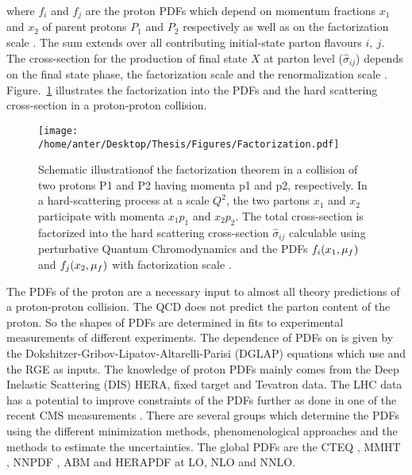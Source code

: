 where $f_i$ and $f_{j}$ are the proton PDFs which depend on momentum fractions $x_1$ and $x_2$ of parent protons $P_1$ and $P_2$ respectively as well as on the factorization scale \muf. The sum extends over all contributing initial-state parton flavours $i,~j$. The cross-section for the production of final state $X$ at parton level ($\hat\sigma_{ij}$) depends on the final state phase, the factorization scale \muf and the renormalization scale \mur. Figure.~\ref{fig:fac} illustrates the factorization into the PDFs and the hard scattering cross-section in a proton-proton collision.
\begin{figure}[!h]
\begin{center}
\hspace*{-7mm}
\texttt{[image: /home/anter/Desktop/Thesis/Figures/Factorization.pdf]}\\
\vspace*{4mm}
\caption[Schematic illustration of factorization theorem in a collision of two protons.]{Schematic illustration\footnotemark of the factorization theorem in a collision of two protons P1 and P2 having momenta p1 and p2, respectively. In a hard-scattering process at a scale $Q^2$, the two partons $x_1$ and $x_2$ participate with momenta $x_1p_1$ and $x_2p_2$. The total cross-section is factorized into the hard scattering cross-section $\hat\sigma_{ij}$ calculable using perturbative Quantum Chromodynamics and the PDFs $f_i(x_1,\mu_f)$ and $f_j(x_2,\mu_f)$ with factorization scale \muf.}
\label{fig:fac}
\end{center}
\end{figure}
The PDFs of the proton are a necessary input to almost all theory predictions of a proton-proton collision. The QCD does not predict the parton content of the proton. So the shapes of PDFs are determined in fits to experimental measurements of different experiments. The dependence of PDFs on \muf is given by the Dokshitzer-Gribov-Lipatov-Altarelli-Parisi (DGLAP) \cite{Gribov:1972ri,Dokshitzer:1977sg,Altarelli:1977zs} equations which use \alps and the RGE as inputs. The knowledge of proton PDFs mainly comes from the Deep Inelastic Scattering (DIS) HERA, fixed target and Tevatron data. The LHC data has a potential to improve constraints of the PDFs further as done in one of the recent CMS measurements \cite{Sirunyan:2017skj}. There are several groups which determine the PDFs using the different minimization methods, phenomenological approaches and the methods to estimate the uncertainties. The global PDFs are the CTEQ \cite{Dulat:2015mca}, MMHT \cite{Harland-Lang:2014zoa}, NNPDF \cite{Ball:2014uwa}, ABM \cite{Alekhin:2012ig} and HERAPDF \cite{Abramowicz:2015mha} at LO, NLO and NNLO.

